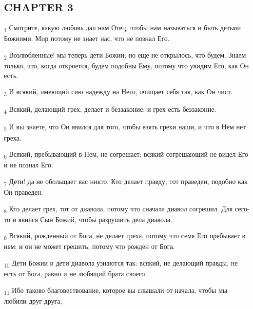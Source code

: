 \subsection{CHAPTER 3}
\begin{tcolorbox}
\textsubscript{1} Смотрите, какую любовь дал нам Отец, чтобы нам называться и быть детьми Божиими. Мир потому не знает нас, что не познал Его.
\end{tcolorbox}
\begin{tcolorbox}
\textsubscript{2} Возлюбленные! мы теперь дети Божии; но еще не открылось, что будем. Знаем только, что, когда откроется, будем подобны Ему, потому что увидим Его, как Он есть.
\end{tcolorbox}
\begin{tcolorbox}
\textsubscript{3} И всякий, имеющий сию надежду на Него, очищает себя так, как Он чист.
\end{tcolorbox}
\begin{tcolorbox}
\textsubscript{4} Всякий, делающий грех, делает и беззаконие; и грех есть беззаконие.
\end{tcolorbox}
\begin{tcolorbox}
\textsubscript{5} И вы знаете, что Он явился для того, чтобы взять грехи наши, и что в Нем нет греха.
\end{tcolorbox}
\begin{tcolorbox}
\textsubscript{6} Всякий, пребывающий в Нем, не согрешает; всякий согрешающий не видел Его и не познал Его.
\end{tcolorbox}
\begin{tcolorbox}
\textsubscript{7} Дети! да не обольщает вас никто. Кто делает правду, тот праведен, подобно как Он праведен.
\end{tcolorbox}
\begin{tcolorbox}
\textsubscript{8} Кто делает грех, тот от диавола, потому что сначала диавол согрешил. Для сего-то и явился Сын Божий, чтобы разрушить дела диавола.
\end{tcolorbox}
\begin{tcolorbox}
\textsubscript{9} Всякий, рожденный от Бога, не делает греха, потому что семя Его пребывает в нем; и он не может грешить, потому что рожден от Бога.
\end{tcolorbox}
\begin{tcolorbox}
\textsubscript{10} Дети Божии и дети диавола узнаются так: всякий, не делающий правды, не есть от Бога, равно и не любящий брата своего.
\end{tcolorbox}
\begin{tcolorbox}
\textsubscript{11} Ибо таково благовествование, которое вы слышали от начала, чтобы мы любили друг друга,
\end{tcolorbox}
